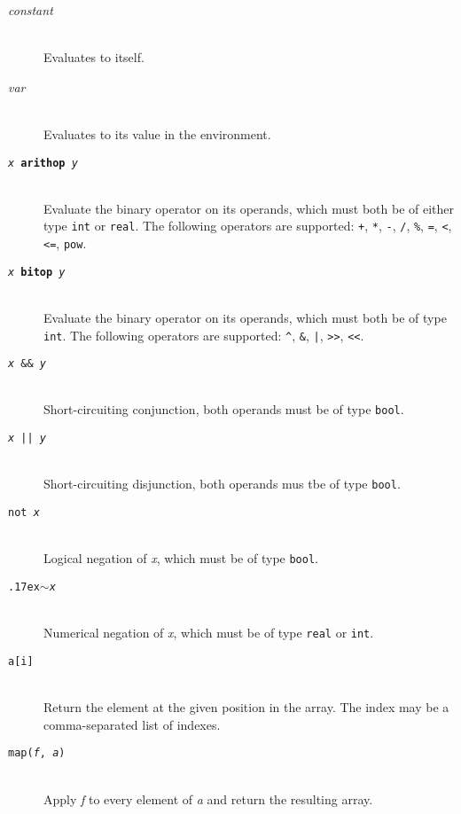 \documentclass[oneside]{memoir}
\newcommand\boolt[0]{\texttt{bool}}
\newcommand\realt[0]{\texttt{real}}
\newcommand\intt[0]{\texttt{int}}
\renewcommand\tilde[0]{{\raise.17ex\hbox{$\scriptstyle\sim$}}}
\begin{document}
\begin{description}
  \item[\textit{constant}]\hfill\\
    Evaluates to itself.

  \item[\textit{var}]\hfill\\
    Evaluates to its value in the environment.

  \item[\texttt{\textit{x} \textbf{arithop} \textit{y}}] \hfill\\
    Evaluate the binary operator on its operands, which must both be
    of either type \intt{} or \realt.  The following operators are
    supported: \texttt{+}, \texttt{*}, \texttt{-}, \texttt{/},
    \texttt{\%}, \texttt{=}, \texttt{<}, \texttt{<=}, \texttt{pow}.

  \item[\texttt{\textit{x} \textbf{bitop} \textit{y}}] \hfill\\
    Evaluate the binary operator on its operands, which must both be
    of type \intt.  The following operators are supported:
    \texttt{\^}, \texttt{\&}, \texttt{|}, \texttt{>>}, \texttt{<<}.

  \item[\texttt{\textit{x} \&\& \textit{y}}]\hfill\\
    Short-circuiting conjunction, both operands must be of type \boolt.

  \item[\texttt{\textit{x} || \textit{y}}]\hfill\\
    Short-circuiting disjunction, both operands mus tbe of type \boolt.

  \item[\texttt{not \textit{x}}]\hfill\\
    Logical negation of \textit{x}, which must be of type \boolt.

  \item[\texttt{\tilde \textit{x}}]\hfill\\
    Numerical negation of \textit{x}, which must be of type \realt{} or \intt.

  \item[\texttt{a[i]}]\hfill\\
    Return the element at the given position in the array.  The index
    may be a comma-separated list of indexes.

  \item[\texttt{map(\textit{f}, \textit{a})}]\hfill\\
    Apply \textit{f} to every element of \textit{a} and return the resulting array.


\end{description}
\end{document}
